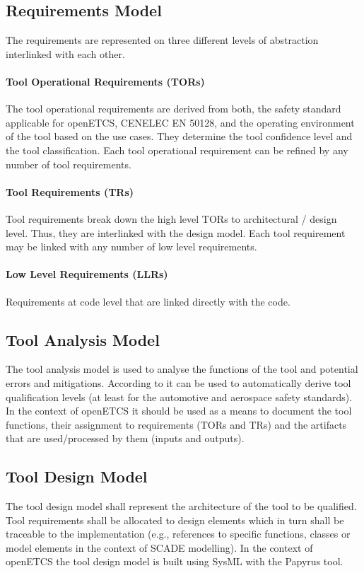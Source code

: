 \subsection{Requirements Model}

The requirements are represented on three different levels of abstraction interlinked with each other.

\paragraph{Tool Operational Requirements (TORs)}
The tool operational requirements are derived from both, the safety standard applicable for openETCS, CENELEC EN 50128, and the operating environment of the tool based on the use cases. They determine the tool confidence level and the tool classification. Each tool operational requirement can be refined by any number of tool requirements. 

\paragraph{Tool Requirements (TRs)}
Tool requirements break down the high level TORs to architectural / design level. Thus, they are interlinked with the design model. Each tool requirement may be linked with any number of low level requirements. 

\paragraph{Low Level Requirements (LLRs)}
Requirements at code level that are linked directly with the code.

\subsection{Tool Analysis Model}
The tool analysis model is used to analyse the functions of the tool and potential errors and mitigations. According to \cite{slotosch_model-based_2012} it can be used to automatically derive tool qualification levels (at least for the automotive and aerospace safety standards). In the context of openETCS it should be used as a means to document the tool functions, their assignment to requirements (TORs and TRs) and the artifacts that are used/processed by them (inputs and outputs).

\subsection{Tool Design Model}
The tool design model shall represent the architecture of the tool to be qualified. Tool requirements shall be allocated to design elements which in turn shall be traceable to the implementation (e.g., references to specific functions, classes or model elements in the context of SCADE modelling). In the context of openETCS the tool design model is built using SysML with the Papyrus tool.

